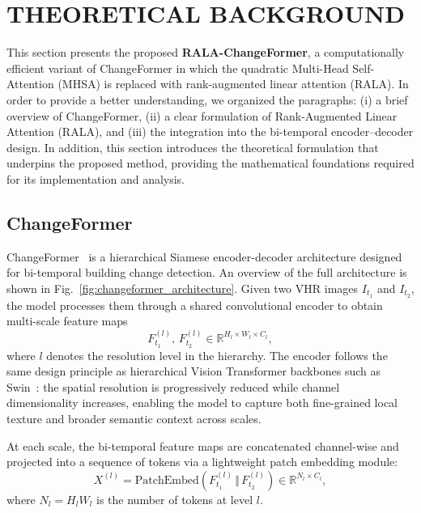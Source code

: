 \section{\uppercase{Theoretical Background}}
\label{sec:theoretical}

This section presents the proposed \textbf{RALA-ChangeFormer}, a computationally efficient variant of ChangeFormer in which the quadratic Multi-Head Self-Attention (MHSA) is replaced with rank-augmented linear attention (RALA). In order to provide a better understanding, we organized the paragraphs: (i) a brief overview of ChangeFormer, (ii) a clear formulation of Rank-Augmented Linear Attention (RALA), and (iii) the integration into the bi-temporal encoder–decoder design. In addition, this section introduces the theoretical formulation that underpins the proposed method, providing the mathematical foundations required for its implementation and analysis.

\subsection{ChangeFormer}
\label{subsec:cf_overview}

ChangeFormer~\cite{Bandara2022ChangeFormer} is a hierarchical Siamese encoder-decoder architecture designed for bi-temporal building change detection. An overview of the full architecture is shown in Fig.~\ref{fig:changeformer_architecture}. Given two VHR images 
$I_{t_1}$ and $I_{t_2}$, the model processes them through a shared convolutional encoder to obtain multi-scale feature maps
\begin{equation}
F_{t_1}^{(l)},\, F_{t_2}^{(l)} \in \mathbb{R}^{H_l \times W_l \times C_l},
\end{equation}
where $l$ denotes the resolution level in the hierarchy. The encoder follows the same design principle as hierarchical Vision Transformer backbones such as Swin~\cite{Teng2023SwinCD}: the spatial resolution is progressively reduced while channel dimensionality increases, enabling the model to capture both fine-grained local texture and broader semantic context across scales.

At each scale, the bi-temporal feature maps are concatenated channel-wise and projected into a sequence of tokens via a lightweight patch embedding module:
\begin{equation}
X^{(l)} = \mathrm{PatchEmbed}\!\left(F_{t_1}^{(l)} \,\Vert\, F_{t_2}^{(l)}\right)
      \in \mathbb{R}^{N_l \times C_l},
\end{equation}
where $N_l = H_lW_l$ is the number of tokens at level $l$.

